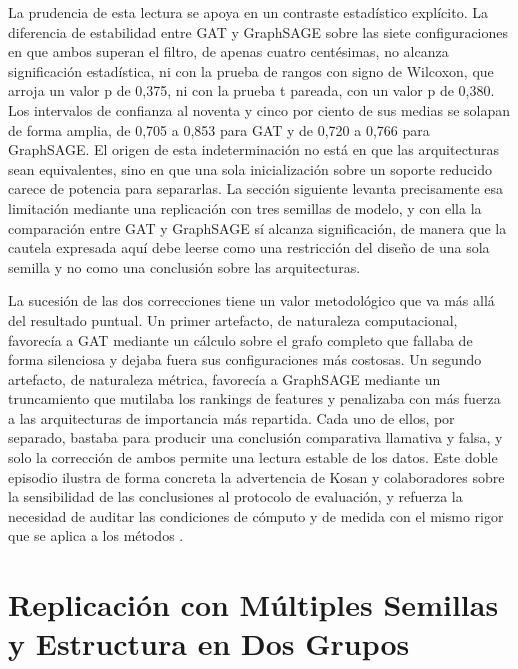 La prudencia de esta lectura se apoya en un contraste estadístico explícito. La diferencia de estabilidad entre GAT y GraphSAGE sobre las siete configuraciones en que ambos superan el filtro, de apenas cuatro centésimas, no alcanza significación estadística, ni con la prueba de rangos con signo de Wilcoxon, que arroja un valor p de 0,375, ni con la prueba t pareada, con un valor p de 0,380. Los intervalos de confianza al noventa y cinco por ciento de sus medias se solapan de forma amplia, de 0,705 a 0,853 para GAT y de 0,720 a 0,766 para GraphSAGE. El origen de esta indeterminación no está en que las arquitecturas sean equivalentes, sino en que una sola inicialización sobre un soporte reducido carece de potencia para separarlas. La sección siguiente levanta precisamente esa limitación mediante una replicación con tres semillas de modelo, y con ella la comparación entre GAT y GraphSAGE sí alcanza significación, de manera que la cautela expresada aquí debe leerse como una restricción del diseño de una sola semilla y no como una conclusión sobre las arquitecturas.

La sucesión de las dos correcciones tiene un valor metodológico que va más allá del resultado puntual. Un primer artefacto, de naturaleza computacional, favorecía a GAT mediante un cálculo sobre el grafo completo que fallaba de forma silenciosa y dejaba fuera sus configuraciones más costosas. Un segundo artefacto, de naturaleza métrica, favorecía a GraphSAGE mediante un truncamiento que mutilaba los rankings de features y penalizaba con más fuerza a las arquitecturas de importancia más repartida. Cada uno de ellos, por separado, bastaba para producir una conclusión comparativa llamativa y falsa, y solo la corrección de ambos permite una lectura estable de los datos. Este doble episodio ilustra de forma concreta la advertencia de Kosan y colaboradores sobre la sensibilidad de las conclusiones al protocolo de evaluación, y refuerza la necesidad de auditar las condiciones de cómputo y de medida con el mismo rigor que se aplica a los métodos \cite{Kosan2023GNNX-BENCH:Benchmarking}.

\section{Replicación con Múltiples Semillas y Estructura en Dos Grupos}

